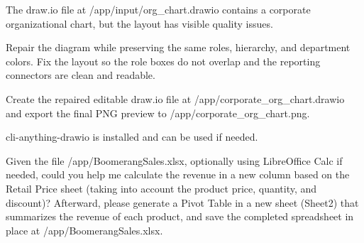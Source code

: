 \documentclass{llmxive}
\begin{document}
\begin{instructionbox}
The draw.io file at \textasciigrave{}/app/input/org\_chart.drawio\textasciigrave{} contains a corporate organizational chart, but the layout has visible quality issues.

Repair the diagram while preserving the same roles, hierarchy, and department colors. Fix the layout so the role boxes do not overlap and the reporting connectors are clean and readable.

Create the repaired editable draw.io file at \textasciigrave{}/app/corporate\_org\_chart.drawio\textasciigrave{} and export the final PNG preview to \textasciigrave{}/app/corporate\_org\_chart.png\textasciigrave{}.

\textasciigrave{}cli-anything-drawio\textasciigrave{} is installed and can be used if needed.
\end{instructionbox}

\begin{instructionbox}
Given the file \textasciigrave{}/app/BoomerangSales.xlsx\textasciigrave{}, optionally using LibreOffice Calc if needed, could you help me calculate the revenue in a new column based on the Retail Price sheet (taking into account the product price, quantity, and discount)? Afterward, please generate a Pivot Table in a new sheet (Sheet2) that summarizes the revenue of each product, and save the completed spreadsheet in place at \textasciigrave{}/app/BoomerangSales.xlsx\textasciigrave{}.
\end{instructionbox}
\end{document}
